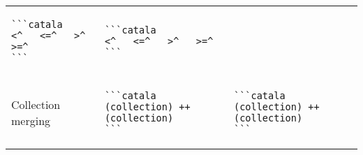\documentclass[a3paper,landscape]{article}
\begin{document}
\begin{multicols*}{2}
\begin{center}
\begin{tabular}{p{}p{}p{}}
      \begin{verbatim}
```catala
<^   <=^   >^   >=^
```
\end{verbatim}
      \vspace*{-1.75em}
                                      &
      \vspace*{-1.75em}
      \begin{verbatim}
```catala
<^   <=^   >^   >=^
```
\end{verbatim}
      \vspace*{-1.75em}
      \\
      Collection merging              &
      \vspace*{-1.75em}
      \begin{verbatim}
```catala
(collection) ++ (collection)
```
\end{verbatim}
      \vspace*{-1.75em}
                                      &
      \vspace*{-1.75em}
      \begin{verbatim}
```catala
(collection) ++ (collection)
```
\end{verbatim}
      \vspace*{-1.75em}
      \\
      \bottomrule
    \end{tabular}
  \end{center}



\end{multicols*}
\end{document}
